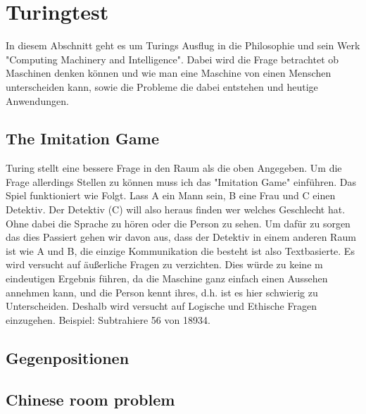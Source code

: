 \section{Turingtest}
In diesem Abschnitt geht es um Turings Ausflug in die Philosophie und sein Werk "Computing Machinery and Intelligence". Dabei wird die Frage betrachtet ob Maschinen denken können und wie man eine Maschine von einen Menschen unterscheiden kann, sowie die Probleme die dabei entstehen und heutige Anwendungen.
\subsection{The Imitation Game}
Turing stellt eine bessere Frage in den Raum als die oben Angegeben. Um die Frage allerdings Stellen zu können muss ich das "Imitation Game" einführen. Das Spiel funktioniert wie Folgt. Lass A ein Mann sein, B eine Frau und C einen Detektiv. Der Detektiv (C) will also heraus finden wer welches Geschlecht hat. Ohne dabei die Sprache zu hören oder die Person zu sehen. Um dafür zu sorgen das dies Passiert gehen wir davon aus, dass der Detektiv in einem anderen Raum ist wie A und B, die einzige Kommunikation die besteht ist also Textbasierte. Es wird versucht auf äußerliche Fragen zu verzichten. Dies würde zu keine m eindeutigen Ergebnis führen, da die Maschine ganz einfach einen Aussehen annehmen kann, und die Person kennt ihres, d.h. ist es hier schwierig zu Unterscheiden. Deshalb wird versucht auf Logische und Ethische Fragen einzugehen. Beispiel: Subtrahiere 56 von 18934.
\subsection{Gegenpositionen}
\subsubsection*{}
\subsection{Chinese room problem}

